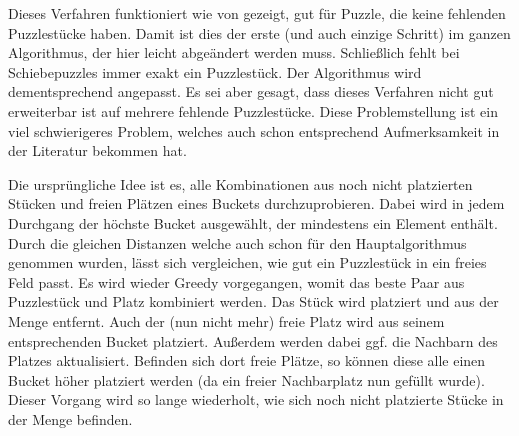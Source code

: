 \documentclass{whswinvcbook}
\begin{document}
Dieses Verfahren funktioniert wie von \cite{gallagher,crisjim} gezeigt, gut für Puzzle, die keine fehlenden Puzzlestücke haben. Damit ist dies der erste (und auch einzige Schritt) im ganzen Algorithmus, der hier leicht abgeändert werden muss. Schließlich fehlt bei Schiebepuzzles immer exakt ein Puzzlestück. Der Algorithmus wird dementsprechend angepasst. Es sei aber gesagt, dass dieses Verfahren nicht gut erweiterbar ist auf mehrere fehlende Puzzlestücke. Diese Problemstellung ist ein viel schwierigeres Problem, welches auch schon entsprechend Aufmerksamkeit in der Literatur bekommen hat. \cite{paikin}

Die ursprüngliche Idee ist es, alle Kombinationen aus noch nicht platzierten Stücken und freien Plätzen eines Buckets durchzuprobieren. Dabei wird in jedem Durchgang der höchste Bucket ausgewählt, der mindestens ein Element enthält. Durch die gleichen Distanzen welche auch schon für den Hauptalgorithmus genommen wurden, lässt sich vergleichen, wie gut ein Puzzlestück in ein freies Feld passt. Es wird wieder Greedy vorgegangen, womit das beste Paar aus Puzzlestück und Platz kombiniert werden. Das Stück wird platziert und aus der Menge entfernt. Auch der (nun nicht mehr) freie Platz wird aus seinem entsprechenden Bucket platziert. Außerdem werden dabei ggf. die Nachbarn des Platzes aktualisiert. Befinden sich dort freie Plätze, so können diese alle einen Bucket höher platziert werden (da ein freier Nachbarplatz nun gefüllt wurde). Dieser Vorgang wird so lange wiederholt, wie sich noch nicht platzierte Stücke in der Menge befinden.
\end{document}
